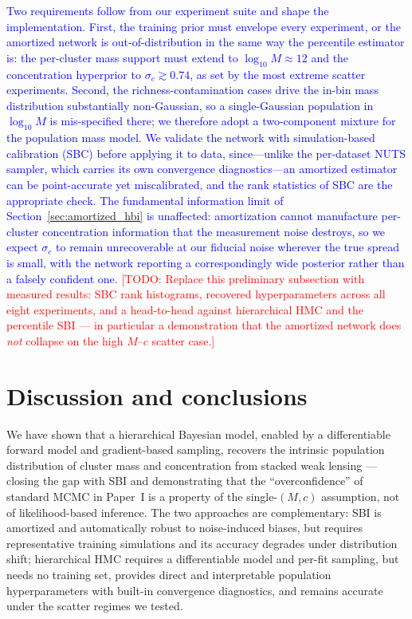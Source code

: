 \documentclass[11pt]{article}
\newcommand{\todo}[1]{\textcolor{red}{[TODO: #1]}}
\newcommand{\prelim}[1]{\textcolor{blue}{#1}}  %
\begin{document}
\prelim{Two requirements follow from our experiment suite and shape the implementation. First, the
training prior must envelope every experiment, or the amortized network is out-of-distribution in the
same way the percentile estimator is: the per-cluster mass support must extend to $\log_{10}M\approx
12$ and the concentration hyperprior to $\sigma_c\gtrsim0.74$, as set by the most extreme scatter
experiments. Second, the richness-contamination cases drive the in-bin mass distribution
substantially non-Gaussian, so a single-Gaussian population in $\log_{10}M$ is mis-specified there;
we therefore adopt a two-component mixture for the population mass model. We validate the network
with simulation-based calibration (SBC) before applying it to data, since---unlike the per-dataset
NUTS sampler, which carries its own convergence diagnostics---an amortized estimator can be
point-accurate yet miscalibrated, and the rank statistics of SBC are the appropriate check. The
fundamental information limit of Section~\ref{sec:amortized_hbi} is unaffected: amortization cannot
manufacture per-cluster concentration information that the measurement noise destroys, so we expect
$\sigma_c$ to remain unrecoverable at our fiducial noise wherever the true spread is small, with the
network reporting a correspondingly wide posterior rather than a falsely confident one.}
\todo{Replace this preliminary subsection with measured results: SBC rank histograms, recovered
hyperparameters across all eight experiments, and a head-to-head against hierarchical HMC and the
percentile SBI --- in particular a demonstration that the amortized network does \emph{not} collapse
on the high $M$--$c$ scatter case.}

\section{Discussion and conclusions}
\label{sec:conc}

We have shown that a hierarchical Bayesian model, enabled by a differentiable forward model and
gradient-based sampling, recovers the intrinsic population distribution of cluster mass and
concentration from stacked weak lensing --- closing the gap with SBI and demonstrating that the
``overconfidence'' of standard MCMC in Paper~I is a property of the single-$(M,c)$ assumption, not
of likelihood-based inference. The two approaches are complementary: SBI is amortized and
automatically robust to noise-induced biases, but requires representative training simulations and
its accuracy degrades under distribution shift; hierarchical HMC requires a differentiable model
and per-fit sampling, but needs no training set, provides direct and interpretable population
hyperparameters with built-in convergence diagnostics, and remains accurate under the scatter
regimes we tested.
\end{document}
